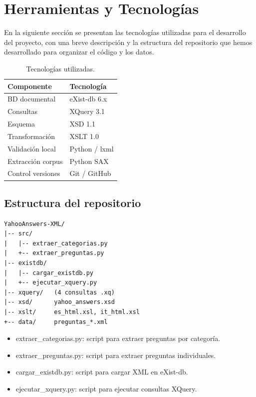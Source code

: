 \documentclass[10pt,twocolumn,a4paper]{article}
\begin{document}
\section{Herramientas y Tecnolog\'ias}
En la siguiente sección se presentan las tecnologías utilizadas para el desarrollo del proyecto,
con una breve descripción y la estructura del repositorio que hemos desarrollado para organizar el código y los datos.

\begin{table}[H]
\centering
\caption{Tecnolog\'ias utilizadas.}
\label{tab:tech}
\begin{tabular}{ll}
\toprule
\textbf{Componente} & \textbf{Tecnolog\'ia} \\
\midrule
BD documental & eXist-db 6.x \\
Consultas & XQuery 3.1 \\
Esquema & XSD 1.1 \\
Transformaci\'on & XSLT 1.0 \\
Validaci\'on local & Python / lxml \\
Extracci\'on corpus & Python SAX \\
Control versiones & Git / GitHub \\
\bottomrule
\end{tabular}
\end{table}

\subsection{Estructura del repositorio}

\begin{lstlisting}[caption={Estructura del repositorio.}, xleftmargin=0.5cm]
YahooAnswers-XML/
|-- src/
|   |-- extraer_categorias.py
|   +-- extraer_preguntas.py
|-- existdb/
|   |-- cargar_existdb.py
|   +-- ejecutar_xquery.py
|-- xquery/   (4 consultas .xq)
|-- xsd/      yahoo_answers.xsd
|-- xslt/     es_html.xsl, it_html.xsl
+-- data/     preguntas_*.xml
\end{lstlisting}

\begin{itemize}
  \item extraer\_categorias.py: script para extraer preguntas por categor\'ia.
  \item extraer\_preguntas.py: script para extraer preguntas individuales.
  \item cargar\_existdb.py: script para cargar XML en eXist-db.
  \item ejecutar\_xquery.py: script para ejecutar consultas XQuery.
\end{itemize}
\end{document}
